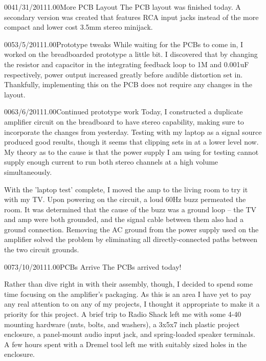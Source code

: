 \documentclass[12pt,letterpaper,onecolumn]{article}
\begin{document}
\begin{nbentry}{004}{1/31/2011}{1.00}{More PCB Layout}
The PCB layout was finished today.  A secondary version was created that features RCA input jacks instead of the more compact and lower cost 3.5mm stereo minijack.
\end{nbentry}

\begin{nbentry}{005}{3/5/2011}{1.00}{Prototype tweaks}
While waiting for the PCBs to come in, I worked on the breadboarded prototype a little bit.  I discovered that by changing the resistor and capacitor in the integrating feedback loop to 1M and 0.001uF respectively, power output increased greatly before audible distortion set in.  Thankfully, implementing this on the PCB does not require any changes in the layout.
\end{nbentry}

\begin{nbentry}{006}{3/6/2011}{1.00}{Continued prototype work}
Today, I constructed a duplicate amplifier circuit on the breadboard to have stereo capability, making sure to incorporate the changes from yesterday.  Testing with my laptop as a signal source produced good results, though it seems that clipping sets in at a lower level now.  My theory as to the cause is that the power supply I am using for testing cannot supply enough current to run both stereo channels at a high volume simultaneously.

With the 'laptop test' complete, I moved the amp to the living room to try it with my TV.  Upon powering on the circuit, a loud 60Hz buzz permeated the room.  It was determined that the cause of the buzz was a ground loop -- the TV and amp were both grounded, and the signal cable between them also had a ground connection.  Removing the AC ground from the power supply used on the amplifier solved the problem by eliminating all directly-connected paths between the two circuit grounds.
\end{nbentry}

\begin{nbentry}{007}{3/10/2011}{1.00}{PCBs Arrive}
The PCBs arrived today!

Rather than dive right in with their assembly, though, I decided to spend some time focusing on the amplifier's packaging.  As this is an area I have yet to pay any real attention to on any of my projects, I thought it appropriate to make it a priority for this project.  A brief trip to Radio Shack left me with some 4-40 mounting hardware (nuts, bolts, and washers), a 3x5x7 inch plastic project enclosure, a panel-mount audio input jack, and spring-loaded speaker terminals.  A few hours spent with a Dremel tool left me with suitably sized holes in the enclosure.
\end{nbentry}
\end{document}
